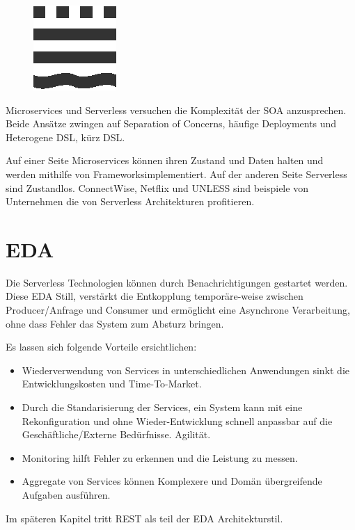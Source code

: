 \documentclass[
12pt,
english,
ngerman,
headsepline,
twoside,
openright,
numbers=noenddot,version=first
]{scrreprt}
\begin{document}
\begin{figure}
	\includegraphics[scale=0.5]{./pics/2015_10_05_THB_Logo_BW.eps}
\end{figure}

Microservices und Serverless versuchen die Komplexität der SOA anzusprechen. Beide Ansätze zwingen auf Separation of Concerns, häufige Deployments und Heterogene \acrfull{DSL}, kürz \acrshort{DSL}.


Auf einer Seite Microservices können ihren Zustand und Daten halten und werden mithilfe von \glqq Frameworks\grqq implementiert. Auf der anderen Seite Serverless sind Zustandlos.
ConnectWise\cite{ConnectWise}, Netflix\cite{Netflix} und UNLESS\cite{UNLESS} sind beispiele von Unternehmen die von Serverless Architekturen profitieren.

\section{EDA}

Die Serverless Technologien können durch Benachrichtigungen gestartet werden. Diese \acrfull{EDA} Still, verstärkt die Entkopplung temporäre-weise zwischen Producer/Anfrage und Consumer und ermöglicht eine Asynchrone Verarbeitung, ohne dass Fehler das System zum Absturz bringen.


Es lassen sich folgende Vorteile ersichtlichen:
\begin{itemize}
	\item Wiederverwendung von Services in unterschiedlichen Anwendungen sinkt die Entwicklungskosten und Time-To-Market.
	\item Durch die Standarisierung der Services, ein System kann mit eine Rekonfiguration und ohne Wieder-Entwicklung schnell anpassbar auf die Geschäftliche/Externe Bedürfnisse. Agilität.
	\item Monitoring hilft Fehler zu erkennen und die Leistung zu messen.
	\item Aggregate von Services können Komplexere und Domän übergreifende Aufgaben ausführen.
\end{itemize}
Im späteren Kapitel tritt REST als teil der \acrshort{EDA} Architekturstil.
\end{document}
